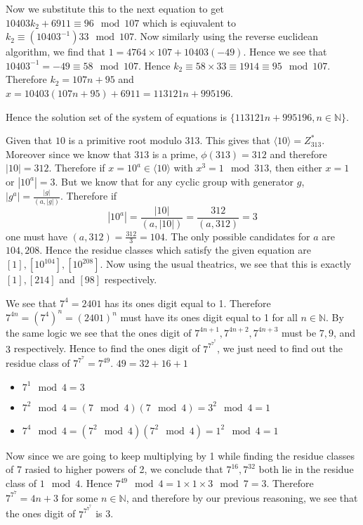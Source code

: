 \documentclass[12pt]{exam}
\theoremstyle{plain} %
\theoremstyle{definition} %
\theoremstyle{remark} %
\begin{document}
\begin{questions}
\begin{solution}
    Now we substitute this to the next equation to get $10403k_2 + 6911 \equiv 96 \mod 107$ which is eqiuvalent to $k_2 \equiv(10403^{-1}) 33 \mod 107$. Now similarly using the reverse euclidean algorithm, we find that $1 = 4764 \times107 + 10403(-49)$. Hence we see that $10403^{-1} = -49 \equiv 58 \mod 107$. Hence $ k_2 \equiv 58\times33 \equiv 1914 \equiv 95 \mod 107$. Therefore $k_2 = 107n + 95$ and $x = 10403(107n + 95) + 6911 = 113121n + 995196$.

    Hence the solution set of the system of equations is $ \{ 113121n + 995196,   n \in \mathbb{N} \}$.
  \end{solution}

  \question
  \begin{solution}
    Given that $10$ is a primitive root modulo 313. This gives that $\langle  10  \rangle = Z_{313}^{*}$. Moreover since we know that $313$ is a prime, $\phi(313) = 312$ and therefore $|10| = 312$. Therefore if $x = 10^a \in  \langle 10 \rangle$ with $x^3 = 1 \mod 313$, then either $x = 1$ or $|10^a| = 3$. But we know that for any cyclic group with generator $g$, $|g^a| = \frac{|g|}{(a, |g|)}$. Therefore if $$|10^a| = \frac{|10|}{(a, |10|)} = \frac{312}{(a, 312)} = 3$$
    one must have $(a, 312) = \frac{312}{3} = 104$. The only possible candidates for $a$ are $104, 208$. Hence the residue classes which satisfy the given equation are $[1], [10^{104}], [10^{208}]$. Now using the usual theatrics, we see that this is exactly $[1], [214]$ and $[98]$ respectively.
  \end{solution}

  \question
  \begin{solution}
    We see that $7^4 = 2401$ has its ones digit equal to 1. Therefore $7^{4n} = (7^4)^n = (2401)^n$ must have its ones digit equal to 1 for all $n \in \mathbb{N}$. By the same logic we see that the ones digit of $7^{4n+1}, 7^{4n+2}, 7^{4n+3}$ must be $7, 9$, and $3$ respectively. Hence to find the ones digit of $7^{7^{7^7}}$, we just need to find out the residue class of $7^{7^7} = 7^{49}$. $49 = 32 + 16 + 1$ \begin{itemize}[]
      \item $7^1 \mod 4 = 3$
      \item $7^2 \mod 4 = (7 \mod 4)(7 \mod 4) = 3^{2} \mod 4 = 1 $
      \item $7^4 \mod 4 = (7^2 \mod 4)(7^2 \mod 4) = 1^{2} \mod 4 = 1 $
    \end{itemize}
    Now since we are going to keep multiplying by 1 while finding the residue classes of 7 rasied to higher powers of 2, we conclude that $7^{16}, 7^{32}$ both lie in the residue class of $1 \mod 4$. Hence $7^{49} \mod 4 = 1\times1\times3 \mod 7 = 3$. Therefore $7^{7^{7}} = 4n +3$ for some $n \in \mathbb{N}$, and therefore by our previous reasoning, we see that the ones digit of $7^{7^{7^{7}}}$ is 3.
  \end{solution}


\end{questions}
\end{document}
